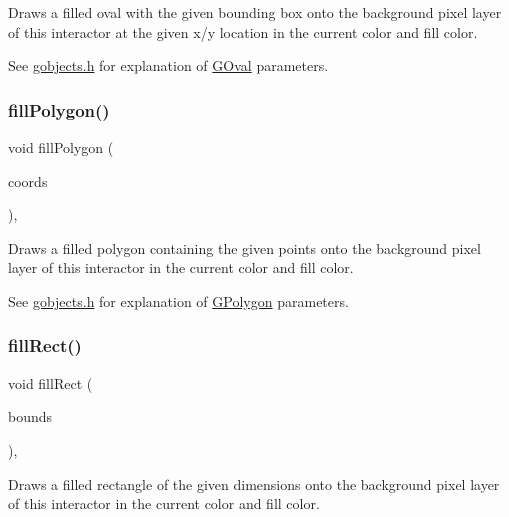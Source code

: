 Draws a filled oval with the given bounding box onto the background pixel layer of this interactor at the given x/y location in the current color and fill color. 

See \mbox{\hyperlink{gobjects_8h_source}{gobjects.\+h}} for explanation of \mbox{\hyperlink{classGOval}{G\+Oval}} parameters. \mbox{\label{classGDrawingSurface_a15f8c1c4409ef51c1a30a92a195b8f66}} 
\subsubsection{\texorpdfstring{fill\+Polygon()}{fillPolygon()}}
{\footnotesize\ttfamily void fill\+Polygon (\begin{DoxyParamCaption}\item[{std\+::initializer\+\_\+list$<$ double $>$}]{coords }\end{DoxyParamCaption})\hspace{0.3cm}{\ttfamily [virtual]}, {\ttfamily [inherited]}}



Draws a filled polygon containing the given points onto the background pixel layer of this interactor in the current color and fill color. 

See \mbox{\hyperlink{gobjects_8h_source}{gobjects.\+h}} for explanation of \mbox{\hyperlink{classGPolygon}{G\+Polygon}} parameters. \mbox{\label{classGDrawingSurface_ae6582295003bf2488836b1993dadbad7}} 
\subsubsection{\texorpdfstring{fill\+Rect()}{fillRect()}\hspace{0.1cm}{\footnotesize\ttfamily [1/2]}}
{\footnotesize\ttfamily void fill\+Rect (\begin{DoxyParamCaption}\item[{const \mbox{\hyperlink{classGRectangle}{G\+Rectangle}} \&}]{bounds }\end{DoxyParamCaption})\hspace{0.3cm}{\ttfamily [virtual]}, {\ttfamily [inherited]}}



Draws a filled rectangle of the given dimensions onto the background pixel layer of this interactor in the current color and fill color. 

